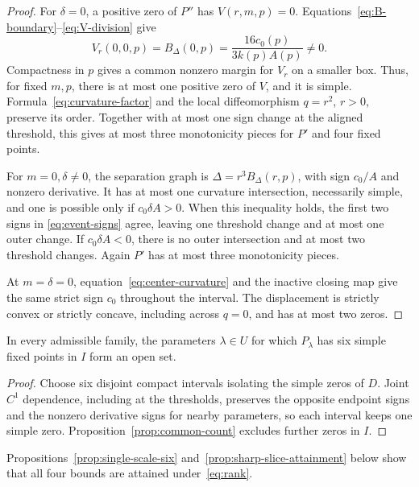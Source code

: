 \begin{proof}
For \(\delta=0\), a positive zero of \(P''\) has \(V(r,m,p)=0\).
Equations~\eqref{eq:B-boundary}--\eqref{eq:V-division} give
\[
 V_r(0,0,p)=B_\Delta(0,p)=\frac{16c_0(p)}{3k(p)A(p)}\ne0.
\]
Compactness in \(p\) gives a common nonzero margin for \(V_r\)
on a smaller box. Thus, for fixed \(m,p\), there is at most one
positive zero of \(V\), and it is simple. Formula~\eqref{eq:curvature-factor}
and the local diffeomorphism \(q=r^2\), \(r>0\), preserve its order. Together with at most one sign change at the aligned threshold,
this gives at most three monotonicity pieces for \(P'\) and four fixed points.

For \(m=0,\delta\ne0\), the separation graph is
\(\Delta=r^3B_\Delta(r,p)\), with sign \(c_0/A\) and nonzero derivative.
It has at most one curvature intersection, necessarily simple, and
one is possible only if \(c_0\delta A>0\).
When this inequality holds, the first two signs in
\eqref{eq:event-signs} agree, leaving one threshold change and
at most one outer change. If \(c_0\delta A<0\), there is no outer
intersection and at most two threshold changes. Again \(P'\)
has at most three monotonicity pieces.

At \(m=\delta=0\), equation~\eqref{eq:center-curvature} and the
inactive closing map give the same strict sign \(c_0\) throughout
the interval. The displacement is strictly convex or strictly
concave, including across \(q=0\), and has at most two zeros.
\end{proof}

\begin{corollary}\label{cor:six-open}
In every admissible family, the parameters \(\lambda\in U\) for which
\(P_\lambda\) has six simple fixed points in \(I\) form an open set.
\end{corollary}

\begin{proof}
Choose six disjoint compact intervals isolating the simple zeros of \(D\).
Joint \(C^1\) dependence, including at the thresholds, preserves the opposite
endpoint signs and the nonzero derivative signs for nearby parameters, so each
interval keeps one simple zero. Proposition~\ref{prop:common-count} excludes
further zeros in \(I\).
\end{proof}

Propositions~\ref{prop:single-scale-six} and~\ref{prop:sharp-slice-attainment}
below show that all four bounds are attained under~\eqref{eq:rank}.


